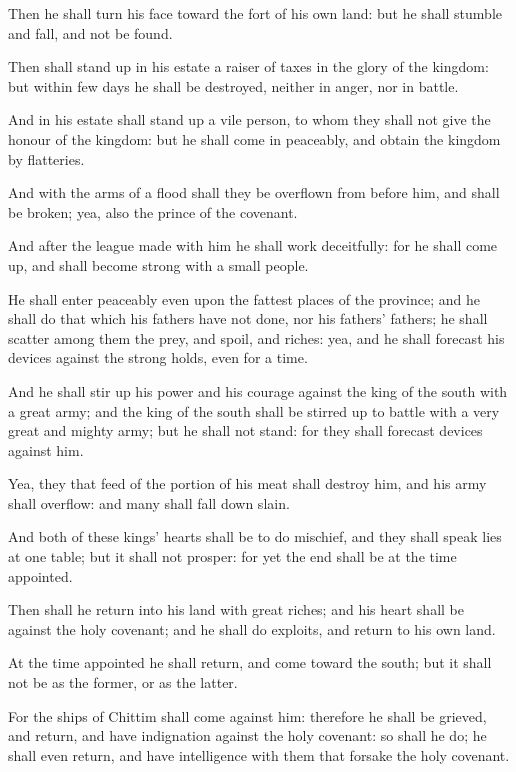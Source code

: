 \Verse Then he shall turn his face toward the fort of his own land: but he shall stumble and fall, and not be found.

\Verse Then shall stand up in his estate a raiser of taxes in the glory of the kingdom: but within few days he shall be destroyed, neither in anger, nor in battle.

\Verse And in his estate shall stand up a vile person, to whom they shall not give the honour of the kingdom: but he shall come in peaceably, and obtain the kingdom by flatteries.

\Verse And with the arms of a flood shall they be overflown from before him, and shall be broken; yea, also the prince of the covenant.

\Verse And after the league made with him he shall work deceitfully: for he shall come up, and shall become strong with a small people.

\Verse He shall enter peaceably even upon the fattest places of the province; and he shall do that which his fathers have not done, nor his fathers' fathers; he shall scatter among them the prey, and spoil, and riches: yea, and he shall forecast his devices against the strong holds, even for a time.

\Verse And he shall stir up his power and his courage against the king of the south with a great army; and the king of the south shall be stirred up to battle with a very great and mighty army; but he shall not stand: for they shall forecast devices against him.

\Verse Yea, they that feed of the portion of his meat shall destroy him, and his army shall overflow: and many shall fall down slain.

\Verse And both of these kings' hearts shall be to do mischief, and they shall speak lies at one table; but it shall not prosper: for yet the end shall be at the time appointed.

\Verse Then shall he return into his land with great riches; and his heart shall be against the holy covenant; and he shall do exploits, and return to his own land.

\Verse At the time appointed he shall return, and come toward the south; but it shall not be as the former, or as the latter.

\Verse For the ships of Chittim shall come against him: therefore he shall be grieved, and return, and have indignation against the holy covenant: so shall he do; he shall even return, and have intelligence with them that forsake the holy covenant.

